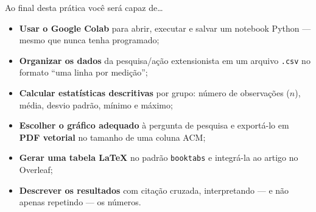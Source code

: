 \documentclass[11pt,a4paper]{article}
\begin{document}
\vspace{0.6em}

\begin{painel}{\faBullseye}{Ao final desta prática você será capaz de\ldots}
\begin{itemize}
    \item \textbf{Usar o Google Colab} para abrir, executar e salvar um notebook Python --- mesmo que nunca tenha programado;
    \item \textbf{Organizar os dados} da pesquisa/ação extensionista em um arquivo \texttt{.csv} no formato ``uma linha por medição'';
    \item \textbf{Calcular estatísticas descritivas} por grupo: número de observações ($n$), média, desvio padrão, mínimo e máximo;
    \item \textbf{Escolher o gráfico adequado} à pergunta de pesquisa e exportá-lo em \textbf{PDF vetorial} no tamanho de uma coluna ACM;
    \item \textbf{Gerar uma tabela \LaTeX{}} no padrão \texttt{booktabs} e integrá-la ao artigo no Overleaf;
    \item \textbf{Descrever os resultados} com citação cruzada, interpretando --- e não apenas repetindo --- os números.
\end{itemize}
\end{painel}

\vspace{0.4em}
\end{document}
